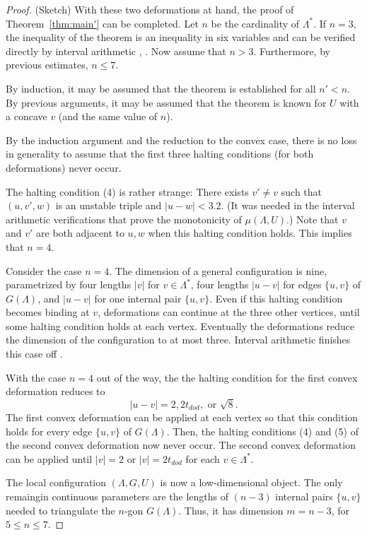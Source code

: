 \begin{proof} (Sketch)
With these two deformations at hand, the proof
of Theorem~\ref{thm:main'} can be completed.  Let $n$ be
the cardinality of $\Lambda^*$.
If $n=3$, the inequality of the theorem is an inequality
in six variables and can be verified directly by interval
arithmetic \cite{code}, \cite[\S7.4.1]{arx}.  Now assume
that $n>3$.  Furthermore, by previous estimates, $n\le 7$.


By induction, it may be assumed that
the theorem is established for all $n'<n$.  By previous arguments,
it may be assumed that the theorem is known for $U$ with a concave
$v$ (and the same value of $n$).

By the induction argument and the reduction to the convex case,
there is no loss in generality to assume that the first three
halting conditions (for both deformations) never occur.  

The  halting condition (4) is rather strange:
There exists $v'\ne v$ such that 
$(u,v',w)$ is an unstable triple and $|u-w|<3.2$.
(It was needed in the interval arithmetic verifications
that prove the monotonicity of $\mu(\Lambda,U)$.)  Note
that $v$ and $v'$ are both adjacent to $u,w$ when this
halting condition holds.  This implies that $n=4$.  

Consider the case $n=4$.  The dimension of a general configuration
is nine, parametrized by four lengths $|v|$ for $v\in\Lambda^*$,
four lengths $|u-v|$ for edges $\{u,v\}$ of $G(\Lambda)$, and $|u-v|$
for one internal pair $\{u,v\}$.
Even
if this halting condition becomes binding at $v$, deformations
can continue at the three other vertices, until some halting
condition holds at each vertex.  Eventually the deformations
reduce the dimension of the configuration to at most three.
Interval arithmetic finishes this case off \cite[\S7.4.2]{arx}.

With the case $n=4$ out of the way, the
the halting condition for the first convex deformation
reduces to
  $$
  |u-v| = 2, 2t_{dod}, \text{ or } \sqrt8.
  $$
The first convex deformation can be applied at each vertex 
so that this condition holds for every edge $\{u,v\}$ of $G(\Lambda)$.
Then, the halting conditions (4) and (5) of the second convex
deformation now never occur.  The second convex deformation can
be applied until $|v|=2$ or $|v|=2t_{dod}$ for each $v\in\Lambda^*$.

The local configuration $(\Lambda,G,U)$ is now a low-dimensional
object.  The only remaingin continuous parameters are the lengths of
$(n-3)$ internal pairs $\{u,v\}$ needed to triangulate the
$n$-gon $G(\Lambda)$.  Thus, it has dimension $m=n-3$,
for $5\le n\le 7$.


\end{proof}

